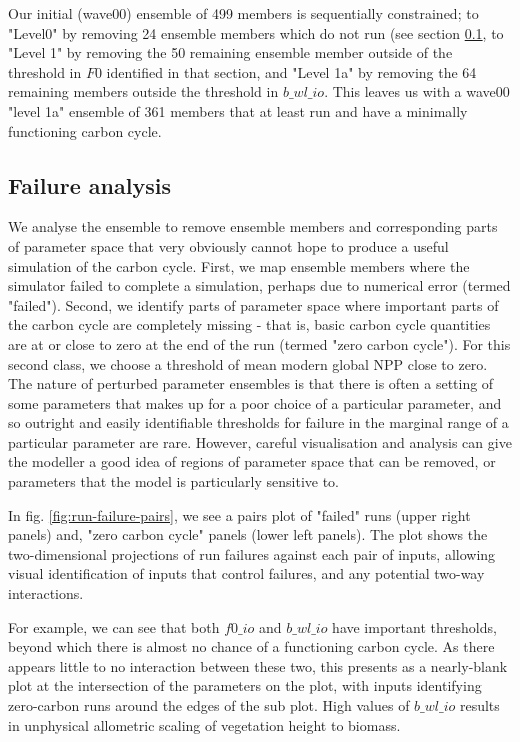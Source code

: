 \documentclass[gmd, manuscript]{copernicus}
\begin{document}
Our initial (wave00) ensemble of 499 members is sequentially constrained; to "Level0" by removing 24 ensemble members which do not run (see section \ref{ssec:failure-analysis}, to "Level 1" by removing the 50 remaining ensemble member outside of the threshold in $F0$ identified in that section, and "Level 1a" by removing the 64 remaining members outside the threshold in $b\_wl\_io$. This leaves us with a wave00 "level 1a" ensemble of 361 members that at least run and have a minimally functioning carbon cycle.

\subsection{Failure analysis}\label{ssec:failure-analysis}

We analyse the ensemble to remove ensemble members and corresponding parts of parameter space that very obviously cannot hope to produce a useful simulation of the carbon cycle. First, we map ensemble members where the simulator failed to complete a simulation, perhaps due to numerical error (termed "failed"). Second, we identify parts of parameter space where important parts of the carbon cycle are completely missing - that is, basic carbon cycle quantities are at or close to zero at the end of the run (termed "zero carbon cycle"). For this second class, we choose a threshold of mean modern global NPP close to zero.
The nature of perturbed parameter ensembles is that there is often a setting of some parameters that makes up for a poor choice of a particular parameter, and so outright and easily identifiable thresholds for failure in the marginal range of a particular parameter are rare. However, careful visualisation and analysis can give the modeller a good idea of regions of parameter space that can be removed, or parameters that the model is particularly sensitive to.

In fig. \ref{fig:run-failure-pairs}, we see a pairs plot of "failed" runs (upper right panels) and, "zero carbon cycle" panels (lower left panels). The plot shows the two-dimensional projections of run failures against each pair of inputs, allowing visual identification of inputs that control failures, and any potential two-way interactions.

For example, we can see that both $f0\_io$ and $b\_wl\_io$ have important thresholds, beyond which there is almost no chance of a functioning carbon cycle. As there appears little to no interaction between these two, this presents as a nearly-blank plot at the intersection of the parameters on the plot, with inputs identifying zero-carbon runs around the edges of the sub plot. High values of $b\_wl\_io$ results in unphysical allometric scaling of vegetation height to biomass.
\end{document}
